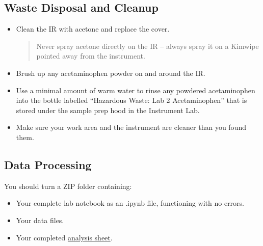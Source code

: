 \documentclass[]{tufte-book}
\providecommand{\tightlist}{%
  \setlength{\itemsep}{0pt}\setlength{\parskip}{0pt}}
\begin{document}
\hypertarget{waste-disposal-and-cleanup-1}{%
\subsection{Waste Disposal and Cleanup}\label{waste-disposal-and-cleanup-1}}

\begin{itemize}
\item
  Clean the IR with acetone and replace the cover.

  \begin{quote}
  Never spray acetone directly on the IR -- always spray it on a Kimwipe pointed away from the instrument.
  \end{quote}
\item
  Brush up any acetaminophen powder on and around the IR.
\item
  Use a minimal amount of warm water to rinse any powdered acetaminophen into the bottle labelled ``Hazardous Waste: Lab 2 Acetaminophen'' that is stored under the sample prep hood in the Instrument Lab.
\item
  Make sure your work area and the instrument are cleaner than you found them.
\end{itemize}

\hypertarget{data-processing-2}{%
\subsection{Data Processing}\label{data-processing-2}}

\begin{marginfigure}
You should turn a ZIP folder containing:

\begin{itemize}
\tightlist
\item
  Your complete lab notebook as an .ipynb file, functioning with no
  errors.\\
\item
  Your data files.\\
\item
  Your completed
  \href{https://github.com/alphonse/alphonse.github.io/raw/master/chem370/assignments/excel-templates/rotation_ftir_data-analysis.xlsx}{analysis
  sheet}.
\end{itemize}
\end{marginfigure}
\end{document}
